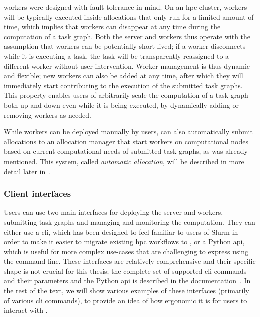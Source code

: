 \hyperqueue{} workers were designed with fault tolerance in mind. On an
\gls{hpc}
cluster, workers will be typically executed inside allocations that only run for a limited amount
of time, which implies that workers can disappear at any time during the computation of a task
graph. Both the server and workers thus operate with the assumption that workers can be potentially
short-lived; if a worker disconnects while it is executing a task, the task will be transparently
reassigned to a different worker without user intervention. Worker management is thus dynamic and
flexible; new workers can also be added at any time, after which they will immediately start
contributing to the execution of the submitted task graphs. This property enables users of
arbitrarily scale the computation of a task graph both up and down even while it is being executed,
by dynamically adding or removing workers as needed.

While workers can be deployed manually by users, \hq{} can also automatically
submit allocations to an allocation manager that start workers on computational nodes based on
current computational needs of submitted task graphs, as was already mentioned. This system, called
\emph{automatic allocation}, will be described in more detail later in~.

\subsubsection*{Client interfaces}
Users can use two main interfaces for deploying the \hyperqueue{} server and workers,
submitting task graphs and managing and monitoring the computation. They can either use a
\gls{cli}, which has been designed to feel familiar to users of Slurm in order to
make it easier to migrate existing \gls{hpc} workflows to \hyperqueue{}, or
a Python \gls{api}, which is useful for more complex use-cases that are challenging
to express using the command line. These interfaces are relatively comprehensive and their specific
shape is not crucial for this thesis; the complete set of supported \gls{cli}
commands and their parameters and the Python \gls{api} is described in the
\hyperqueue{} documentation~\cite{hq_docs}. In the rest of the text, we will
show various examples of these interfaces (primarily of various \gls{cli} commands),
to provide an idea of how ergonomic it is for users to interact with \hyperqueue{}.

